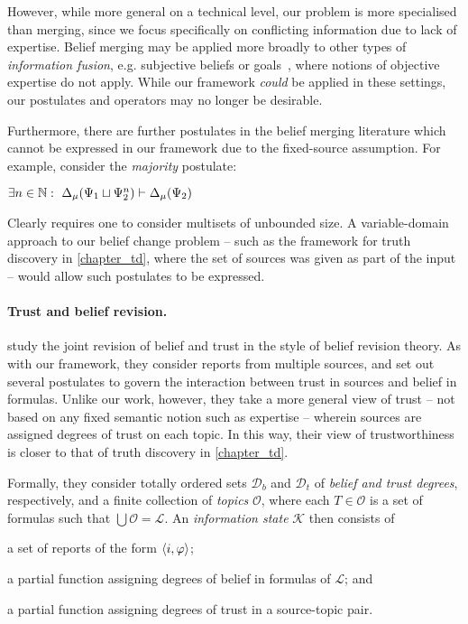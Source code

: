 However, while more general on a technical level, our problem is more
specialised than merging, since we focus specifically on conflicting
information due to lack of expertise. Belief merging may be applied more
broadly to other types of \emph{information fusion}, e.g. subjective beliefs or
goals~\cite{gregoire_fusion_2006}, where notions of objective expertise do not
apply. While our framework \emph{could} be applied in these settings, our
postulates and operators may no longer be desirable.

Furthermore, there are further postulates in the belief merging literature
which cannot be expressed in our framework due to the fixed-source assumption.
For example, consider the \emph{majority} postulate:

\begin{axiom}[\majoritymerging{}]
    $\exists n \in \mathbb{N}:\ \Delta_\mu(\Psi_1 \sqcup \Psi_2^n) \vdash
    \Delta_\mu(\Psi_2)$
\end{axiom}

Clearly \majoritymerging{} requires one to consider multisets of unbounded
size. A variable-domain approach to our belief change problem -- such as the
framework for truth discovery in \cref{chapter_td}, where the set of sources
was given as part of the input -- would allow such postulates to be expressed.

\paragraph{Trust and belief revision.}

\textcite{yasser_21} study the joint revision of belief and trust in the style
of belief revision theory. As with our framework, they consider reports from
multiple sources, and set out several postulates to govern the interaction
between trust in sources and belief in formulas.
%
Unlike our work, however, they take a more general view of trust -- not based
on any fixed semantic notion such as expertise -- wherein sources are assigned
degrees of trust on each topic. In this way, their view of trustworthiness is
closer to that of truth discovery in \cref{chapter_td}.

Formally, they consider totally ordered sets $\mathcal{D}_b$ and
$\mathcal{D}_t$ of \emph{belief and trust degrees}, respectively, and a finite
collection of \emph{topics} $\mathcal{O}$, where each $T \in \mathcal{O}$ is a
set of formulas such that $\bigcup\mathcal{O} = \mathcal{L}$.\footnotemark{} An
\emph{information state} $\mathcal{K}$ then consists of
%
\begin{inlinelist}
    \item a set of reports of the form $\langle {i, \varphi} \rangle$;
    \item a partial function assigning degrees of belief in formulas of
        $\mathcal{L}$; and
    \item a partial function assigning degrees of trust in a source-topic pair.
\end{inlinelist}

